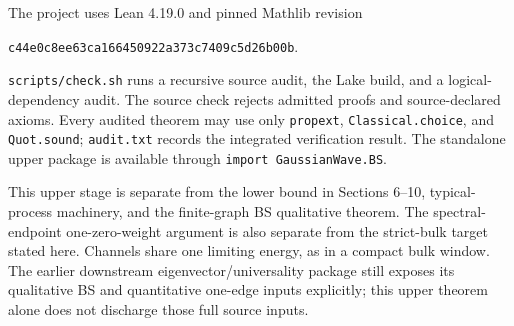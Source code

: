 \documentclass[11pt]{article}
\begin{document}
The project uses Lean 4.19.0 and pinned Mathlib revision
\begin{center}\small\texttt{c44e0c8ee63ca166450922a373c7409c5d26b00b}.
\end{center}
\texttt{scripts/check.sh} runs a recursive source audit, the Lake build, and
a logical-dependency audit. The source check rejects admitted proofs and
source-declared axioms. Every audited theorem may use only
\texttt{propext}, \texttt{Classical.choice}, and \texttt{Quot.sound};
\texttt{audit.txt} records the integrated verification result. The standalone
upper package is available through \texttt{import GaussianWave.BS}.

This upper stage is separate from the lower bound in Sections 6--10,
typical-process machinery, and the finite-graph BS qualitative theorem.
The spectral-endpoint one-zero-weight argument is also separate from the
strict-bulk target stated here. Channels share one limiting energy, as in a
compact bulk window. The earlier downstream eigenvector/universality package
still exposes its qualitative BS and quantitative one-edge inputs explicitly;
this upper theorem alone does not discharge those full source inputs.
\end{document}
